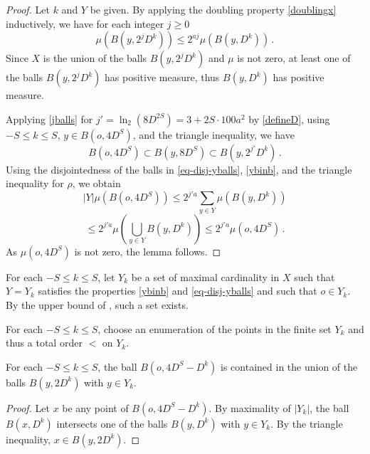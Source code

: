 \begin{proof}
    \leanok
Let $k$ and $Y$ be given. By applying the doubling property \eqref{doublingx} inductively, we have for each integer $j\ge 0$
\begin{equation}\label{jballs}
    \mu(B(y,2^{j}D^k))\le 2^{aj} \mu(B(y,D^k))\, .
\end{equation}
Since $X$ is the union of the balls $B(y,2^{j}D^k)$ and $\mu$ is not zero, at least one of the balls $B(y,2^{j}D^k)$ has positive measure, thus $B(y,D^k)$ has positive measure.

Applying \eqref{jballs} for $j' = \ln_2(8D^{2S}) = 3 + 2S \cdot 100a^2$ by \eqref{defineD}, using $-S\le k\le S$, $y\in B(o,4D^S)$, and the triangle inequality, we have
\begin{equation}
    B(o, 4D^S) \subset B(y, 8D^S) \subset B(y,2^{j'}D^k) \, .
\end{equation}
Using the disjointedness of the balls in \eqref{eq-disj-yballs}, \eqref{ybinb}, and the triangle inequality for $\rho$, we obtain
\begin{equation}
|Y|\mu(B(o,4D^S))\le 2^{j'a}\sum_{y\in Y}\mu(B(y,D^k))
\end{equation}
\begin{equation}
\le
2^{j'a}\mu(\bigcup_{y\in Y}B(y,D^k))
\le 2^{j'a}\mu(o,4D^S)\, .
\end{equation}
As $\mu(o,4D^S)$ is not zero, the lemma follows.
\end{proof}

For each $-S\le k\le S$, let $Y_k$ be a set of
maximal cardinality in $X$ such that $Y=Y_k$ satisfies
the properties \eqref{ybinb} and \eqref{eq-disj-yballs} and such that $o \in Y_k$.
By the upper bound of , such a set exists.

For each $-S\le k\le S$, choose an enumeration of the points in the finite set $Y_k$ and thus a total
order $<$ on $Y_{k}$.

\begin{lemma}
    \label{cover-big-ball}
    \leanok
    For each $-S\le k\le S$, the ball
    $B(o, 4D^S-D^k)$ is contained
    in the union of the balls $B(y,2D^k)$ with $y\in Y_k$.
\end{lemma}

\begin{proof}
\leanok
Let $x$ be any point of $B(o, 4D^S-D^k)$. By maximality of $|Y_k|$, the ball
$B(x, D^k)$ intersects one of the balls
$B(y, D^k)$ with $y\in Y_k$. By the triangle
inequality, $x\in B(y,2D^k)$.
\end{proof}

